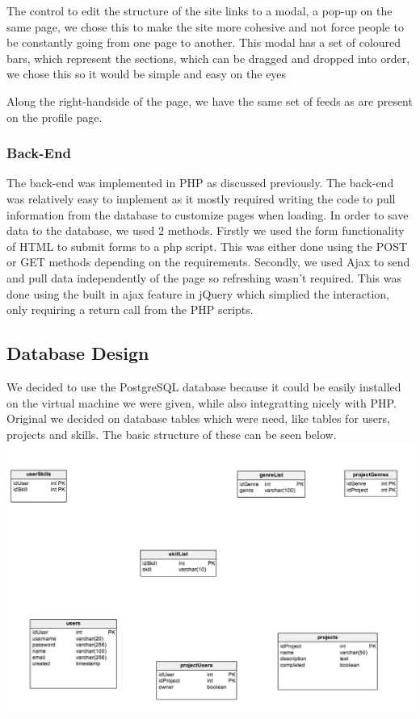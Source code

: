 \documentclass{article}
\begin{document}
The control to edit the structure of the site links to a modal, a pop-up on the same page, we chose this to make the site more cohesive and not force people to be constantly going from one page to another. This modal has a set of coloured bars, which represent the sections, which can be dragged and dropped into order, we chose this so it would be simple and easy on the eyes

Along the right-handside of the page, we have the same set of feeds as are present on the profile page.

\subsubsection{Back-End}
The back-end was implemented in PHP as discussed previously. The back-end was relatively easy to implement as it mostly required writing the code to pull information from the database to customize pages when loading. In order to save data to the database, we used 2 methods. Firstly we used the form functionality of HTML to submit forms to a php script. This was either done using the POST or GET methods depending on the requirements. Secondly, we used Ajax to send and pull data independently of the page so refreshing wasn't required. This was done using the built in ajax feature in jQuery which simplied the interaction, only requiring a return call from the PHP scripts.

\subsection{Database Design}
We decided to use the PostgreSQL database because it could be easily installed on the virtual machine we were given, while also integratting nicely with PHP. Original we decided on database tables which were need, like tables for users, projects and skills. The basic structure of these can be seen below.
\includegraphics[width=180mm]{1.png}
\end{document}
